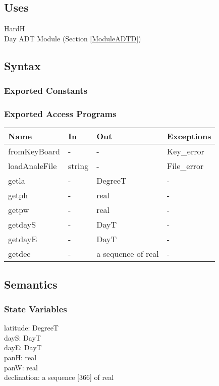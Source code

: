 \documentclass[12pt, titlepage]{article}
\begin{document}
\subsection{Uses}
HardH\\
Day ADT Module (Section \ref{ModuleADTD})

\subsection{Syntax}

\subsubsection{Exported Constants}


\subsubsection{Exported Access Programs}

\begin{center}
\begin{tabular}{p{4cm} p{2cm} p{4cm} p{2cm}}
\hline
\textbf{Name} & \textbf{In} & \textbf{Out} & \textbf{Exceptions} \\
\hline 
fromKeyBoard & - & - & Key\_error \\
loadAnaleFile & string & - & File\_error \\
getla & - & DegreeT & - \\
getph & - & real & - \\
getpw & - & real & - \\
getdayS & - & DayT & - \\
getdayE & - & DayT & - \\
getdec & - & a sequence of real & - \\


\hline
\end{tabular}
\end{center}


\subsection{Semantics}

\subsubsection{State Variables}
latitude: DegreeT\\
dayS: DayT \\
dayE: DayT\\
panH: real\\
panW: real\\
declination: a sequence [366] of real
\end{document}
